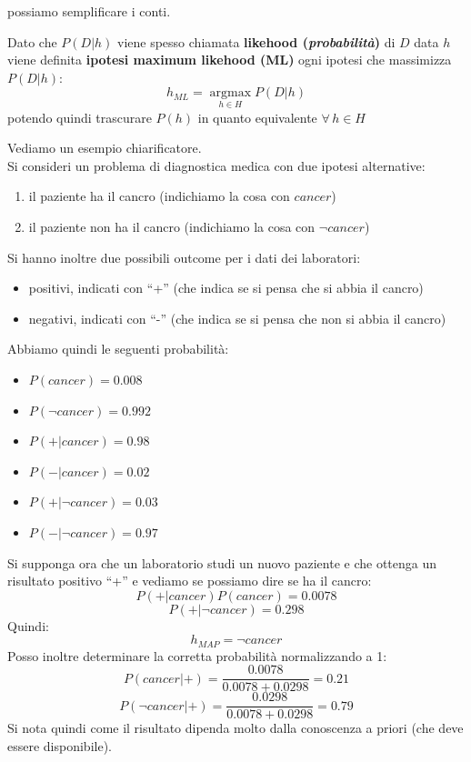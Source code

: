 \documentclass[a4paper,12pt, oneside]{book}
\begin{document}
possiamo semplificare i conti.
\begin{definizione}
  Dato che $P(D|h)$ viene spesso chiamata \textbf{likehood
    (\textit{probabilità})} di $D$ data $h$ viene definita \textbf{ipotesi
    maximum likehood (ML)} ogni ipotesi che massimizza $P(D|h)$:
  \[h_{ML}=\operatorname*{argmax}_{h\in H}P(D|h)\]
  potendo quindi trascurare $P(h)$ in quanto equivalente $\forall\,h\in H$
\end{definizione}
\begin{esempio}
  Vediamo un esempio chiarificatore.\\
  Si consideri un problema di diagnostica medica con due ipotesi alternative:
  \begin{enumerate}
    \item il paziente ha il cancro (indichiamo la cosa con $cancer$)
    \item il paziente non ha il cancro (indichiamo la cosa con $\neg cancer$)
  \end{enumerate}
  Si hanno inoltre due possibili outcome per i dati dei laboratori:
  \begin{itemize}
    \item positivi, indicati con ``+'' (che indica se si pensa che si abbia il
    cancro)
    \item negativi, indicati con ``-'' (che indica se si pensa che non si abbia
    il cancro)
  \end{itemize}
  Abbiamo quindi le seguenti probabilità:
  \begin{itemize}
    \item $P(cancer)=0.008$
    \item $P(\neg cancer)=0.992$
    \item $P(+|cancer)=0.98$
    \item $P(-|cancer)=0.02$
    \item $P(+|\neg cancer)=0.03$
    \item $P(-|\neg cancer)=0.97$
  \end{itemize}
  Si supponga ora che un laboratorio studi un nuovo paziente e che ottenga un
  risultato positivo ``+'' e vediamo se possiamo dire se ha il cancro:
  \[P(+|cancer)P(cancer)=0.0078\]
  \[P(+|\neg cancer)=0.298\]
  Quindi:
  \[h_{MAP}=\neg cancer\]
  Posso inoltre determinare la corretta probabilità normalizzando a 1:
  \[P(cancer|+)=\frac{0.0078}{0.0078+0.0298}=0.21\]
  \[P(\neg cancer|+)=\frac{0.0298}{0.0078+0.0298}=0.79\]
  Si nota quindi come il risultato dipenda molto dalla conoscenza a priori (che
  deve essere disponibile).
\end{esempio}
\end{document}
